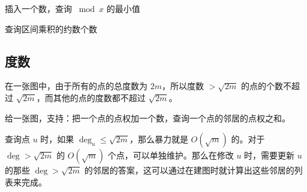 \begin{example}[P9809]
    插入一个数，查询 $\bmod x$ 的最小值 
\end{example}

\begin{example}[P5071]
    查询区间乘积的约数个数
\end{example}

\subsection{度数}

在一张图中，由于所有的点的总度数为 $2m$，所以度数 $>\sqrt{2m}$ 的点的个数不超过 $\sqrt{2m}$，而其他的点的度数都不超过 $\sqrt{2m}$。

\begin{example}[单点加一圈和]
    给一张图，支持：把一个点的点权加一个数，查询一个点的邻居的点权之和。
\end{example}
\begin{solution}
    查询点 $u$ 时，如果 $\deg_u\le \sqrt{2m}$，那么暴力就是 $O(\sqrt{m})$ 的。对于 $\deg>\sqrt{2m}$ 的 $O(\sqrt{m})$ 个点，可以单独维护。那么在修改 $u$ 时，需要更新 $u$ 的那些 $\deg>\sqrt{2m}$ 的邻居的答案，这可以通过在建图时就计算出这些邻居的列表来完成。
\end{solution}


